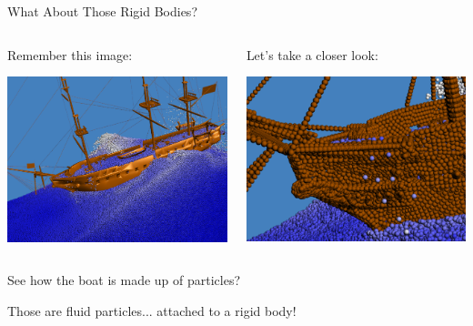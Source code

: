 \documentclass[12pt]{beamer}
\begin{document}
\begin{frame}{What About Those Rigid Bodies?}
\pause

\begin{columns}

\begin{block}{Remember this image:}
\begin{center}
\includegraphics[scale=0.35]{Akinci-Boat}
\end{center}
\end{block}

\pause
{}

\begin{block}{Let's take a closer look:}
\begin{center}
\includegraphics[scale=0.35]{Akinci-Boat-Closeup}
\end{center}
\end{block}

\end{columns}

\pause

See how the boat is made up of particles? \pause

\color{white}
Those are fluid particles... \pause attached to a rigid body!
\end{frame}
\end{document}
